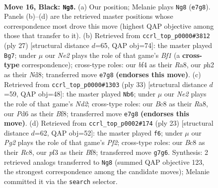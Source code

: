 \documentclass[11pt]{article}
\begin{document}
\clearpage

\begin{figure}[p]\centering
\begin{subfigure}{0.46\textwidth}\centering
\resizebox{\linewidth}{!}{%
\newchessgame
\chessboard[
  setfen={r1b2b1r/p2kn1pp/2pp4/5p2/2N2B2/3B1P2/PPP3PP/R3R1K1 b - - 7 16},
  showmover=false,
  pgfstyle=straightmove, color=movearrow, markmove={e7-g8}
]}
\caption{}
\end{subfigure}\hfill
\begin{subfigure}{0.46\textwidth}\centering
\resizebox{\linewidth}{!}{%
\newchessgame
\chessboard[
  setfen={r2nkb1r/1p2p2p/p3p1p1/8/2B3n1/2P5/PP4PP/R1BN1RK1 b kq - 2 14},
  showmover=false,
  pgfstyle=straightmove, color=movearrow, markmove={f8-g7}
]}
\caption{}
\end{subfigure}
\\[4pt]
\begin{subfigure}{0.46\textwidth}\centering
\resizebox{\linewidth}{!}{%
\newchessgame
\chessboard[
  setfen={r3kb1r/3n1ppp/p3p3/1pp1P3/4NB1P/5P2/PPP3P1/2KR3R b kq - 0 17},
  showmover=false,
  pgfstyle=straightmove, color=movearrow, markmove={d7-b6}
]}
\caption{}
\end{subfigure}\hfill
\begin{subfigure}{0.46\textwidth}\centering
\resizebox{\linewidth}{!}{%
\newchessgame
\chessboard[
  setfen={2r1kb1r/pp1b1ppp/2n1p3/8/2B5/2P1BN2/PPK2PPP/3R3R b k - 6 12},
  showmover=false,
  pgfstyle=straightmove, color=movearrow, markmove={f7-f6}
]}
\caption{}
\end{subfigure}
\caption{\textbf{Move 16, Black: \texttt{Ng8}.} (a) Our position; Melanie plays \texttt{Ng8} (\texttt{e7g8}). Panels (b)--(d) are the retrieved master positions whose correspondence most drove this move (highest QAP objective among those that transfer to it). (b) Retrieved from \texttt{ccrl\_top\_p0000\#3812} (ply 27) [structural distance $d$=65, QAP obj=74]: the master played \texttt{Bg7}; under $\mu$ our \emph{Ne2} plays the role of that game's \emph{Bf1} (a \textbf{cross-type} correspondence); cross-type roles: our \emph{b}f4 as their \emph{R}a8, our \emph{p}h2 as their \emph{N}d8; transferred move \texttt{e7g8} \textbf{(endorses this move)}. (c) Retrieved from \texttt{ccrl\_top\_p0000\#1303} (ply 33) [structural distance $d$=59, QAP obj=48]: the master played \texttt{Nb6}; under $\mu$ our \emph{Ne2} plays the role of that game's \emph{Nd2}; cross-type roles: our \emph{B}c8 as their \emph{R}a8, our \emph{P}d6 as their \emph{B}f8; transferred move \texttt{e7g8} \textbf{(endorses this move)}. (d) Retrieved from \texttt{ccrl\_top\_p0002\#174} (ply 23) [structural distance $d$=62, QAP obj=52]: the master played \texttt{f6}; under $\mu$ our \emph{Pg2} plays the role of that game's \emph{Pf2}; cross-type roles: our \emph{B}c8 as their \emph{R}c8, our \emph{p}f3 as their \emph{B}f8; transferred move \texttt{g7g6}. Synthesis: 2 retrieved analogs transferred to \texttt{Ng8} (summed QAP objective 123, the strongest correspondence among the candidate moves); Melanie committed it via the \texttt{search} selector.}
\label{fig:thought-m31}
\end{figure}
\end{document}

